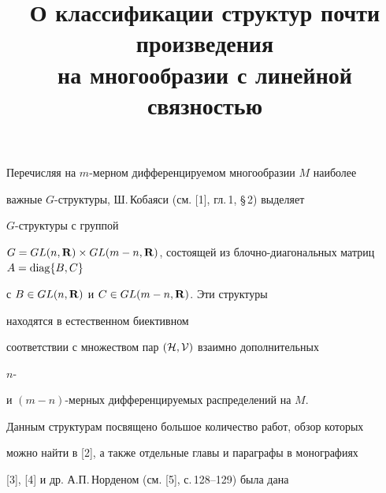 \title{О классификации структур почти произведения\\ 


на многообразии с линейной связностью} 


 


\date{} 




 


\pagestyle{plain} %


 


 




 


\maketitle 


\label{begin} 


 


 


 


 


Перечисляя на $m$-мерном дифференцируемом многообразии $M$ наиболее 


важные $G$-структу\-ры, Ш.\,Кобаяси (см. [1], гл.\,1, \S\,2) выделяет 


$G$-структуры с группой 


$G=GL(n,\bold R)\times GL(m-n,\bold R)$, состоящей из блочно-диагональных матриц $A=\operatorname{diag}\{B,C\}$ 


с $B\in GL(n,\bold R)$ и $C\in GL(m-n,\bold R)$. Эти структуры 


находятся в естественном биективном 


соответствии с множеством пар $(\cal H,\cal V)$ взаимно дополнительных 


$n$- 


и $(m-n)$-мерных дифференцируемых распределений на $M$. 


 


Данным структурам посвящено большое количество работ, обзор которых 


можно найти в [2], а также отдельные главы и параграфы в монографиях 


[3], [4] и др. А.П.\,Норденом (см. [5], с.\,128--129) была дана 


